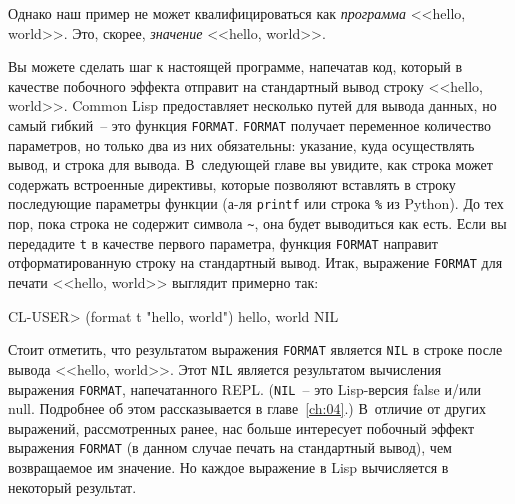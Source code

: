Однако наш пример не может квалифицироваться как \emph{программа} <<hello, world>>.
Это, скорее, \emph{значение} <<hello, world>>.

Вы можете сделать шаг к настоящей программе, напечатав код, который в качестве побочного
эффекта отправит на стандартный вывод строку <<hello, world>>. Common Lisp предоставляет
несколько путей для вывода данных, но самый гибкий~-- это функция \lstinline{FORMAT}. \lstinline{FORMAT} получает
переменное количество параметров, но только два из них обязательны: указание, куда
осуществлять вывод, и строка для вывода. В~следующей главе вы увидите, как строка может
содержать встроенные директивы, которые позволяют вставлять в строку последующие параметры
функции (а-ля \lstinline{printf} или строка \lstinline|%| из Python). До тех пор, пока строка
не содержит символа \lstinline|~|, она будет выводиться как есть. Если вы передадите \texttt{t} в
качестве первого параметра, функция \lstinline{FORMAT} направит отформатированную строку на
стандартный вывод. Итак, выражение \lstinline{FORMAT} для печати <<hello, world>> выглядит примерно
так:

\begin{myverb}
CL-USER> (format t "hello, world")
hello, world
NIL
\end{myverb}

Стоит отметить, что результатом выражения \lstinline{FORMAT} является \lstinline{NIL} в строке после
вывода <<hello, world>>. Этот \lstinline{NIL} является результатом вычисления выражения \lstinline{FORMAT},
напечатанного REPL. (\lstinline{NIL}~-- это Lisp-версия false и/или null. Подробнее об этом
рассказывается в главе~\ref{ch:04}.) В~отличие от других выражений, рассмотренных ранее, нас больше
интересует побочный эффект выражения \lstinline{FORMAT} (в данном случае печать на стандартный
вывод), чем возвращаемое им значение. Но каждое выражение в Lisp вычисляется в некоторый
результат.

